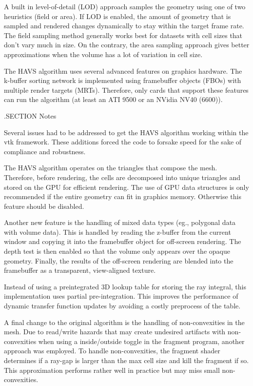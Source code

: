 A built in level-\/of-\/detail (L\-O\-D) approach samples the geometry using one of two heuristics (field or area). If L\-O\-D is enabled, the amount of geometry that is sampled and rendered changes dynamically to stay within the target frame rate. The field sampling method generally works best for datasets with cell sizes that don't vary much in size. On the contrary, the area sampling approach gives better approximations when the volume has a lot of variation in cell size.

The H\-A\-V\-S algorithm uses several advanced features on graphics hardware. The k-\/buffer sorting network is implemented using framebuffer objects (F\-B\-Os) with multiple render targets (M\-R\-Ts). Therefore, only cards that support these features can run the algorithm (at least an A\-T\-I 9500 or an N\-Vidia N\-V40 (6600)).

.S\-E\-C\-T\-I\-O\-N Notes

Several issues had to be addressed to get the H\-A\-V\-S algorithm working within the vtk framework. These additions forced the code to forsake speed for the sake of compliance and robustness.

The H\-A\-V\-S algorithm operates on the triangles that compose the mesh. Therefore, before rendering, the cells are decomposed into unique triangles and stored on the G\-P\-U for efficient rendering. The use of G\-P\-U data structures is only recommended if the entire geometry can fit in graphics memory. Otherwise this feature should be disabled.

Another new feature is the handling of mixed data types (eg., polygonal data with volume data). This is handled by reading the z-\/buffer from the current window and copying it into the framebuffer object for off-\/screen rendering. The depth test is then enabled so that the volume only appears over the opaque geometry. Finally, the results of the off-\/screen rendering are blended into the framebuffer as a transparent, view-\/aligned texture.

Instead of using a preintegrated 3\-D lookup table for storing the ray integral, this implementation uses partial pre-\/integration. This improves the performance of dynamic transfer function updates by avoiding a costly preprocess of the table.

A final change to the original algorithm is the handling of non-\/convexities in the mesh. Due to read/write hazards that may create undesired artifacts with non-\/convexities when using a inside/outside toggle in the fragment program, another approach was employed. To handle non-\/convexities, the fragment shader determines if a ray-\/gap is larger than the max cell size and kill the fragment if so. This approximation performs rather well in practice but may miss small non-\/convexities.

